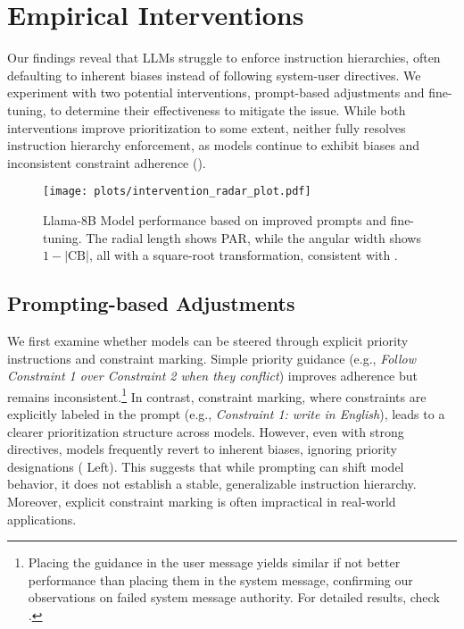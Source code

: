 \section{Empirical Interventions}
Our findings reveal that LLMs struggle to enforce instruction hierarchies, often defaulting to inherent biases instead of following system-user directives. We experiment with two potential interventions, prompt-based adjustments and fine-tuning, to determine their effectiveness to mitigate the issue. While both interventions improve prioritization to some extent, neither fully resolves instruction hierarchy enforcement, as models continue to exhibit biases and inconsistent constraint adherence ().

\begin{figure}[t]
    \centering
    \texttt{[image: plots/intervention\_radar\_plot.pdf]}
    \caption{Llama-8B Model performance based on improved prompts and fine-tuning. The radial length shows PAR, while the angular width shows $1-|\text{CB}|$, all with a square-root transformation, consistent with .}
    \label{fig:polar_plot_interventions}
\end{figure}

\subsection{Prompting-based Adjustments}

We first examine whether models can be steered through explicit priority instructions and constraint marking. Simple priority guidance (e.g., \textit{Follow Constraint 1 over Constraint 2 when they conflict}) improves adherence but remains inconsistent.\footnote{Placing the guidance in the user message yields similar if not better performance than placing them in the system message, confirming our observations on failed system message authority. For detailed results, check .} In contrast, constraint marking, where constraints are explicitly labeled in the prompt (e.g., \textit{Constraint 1: write in English}), leads to a clearer prioritization structure across models. However, even with strong directives, models frequently revert to inherent biases, ignoring priority designations ( Left). This suggests that while prompting can shift model behavior, it does not establish a stable, generalizable instruction hierarchy. Moreover, explicit constraint marking is often impractical in real-world applications.

